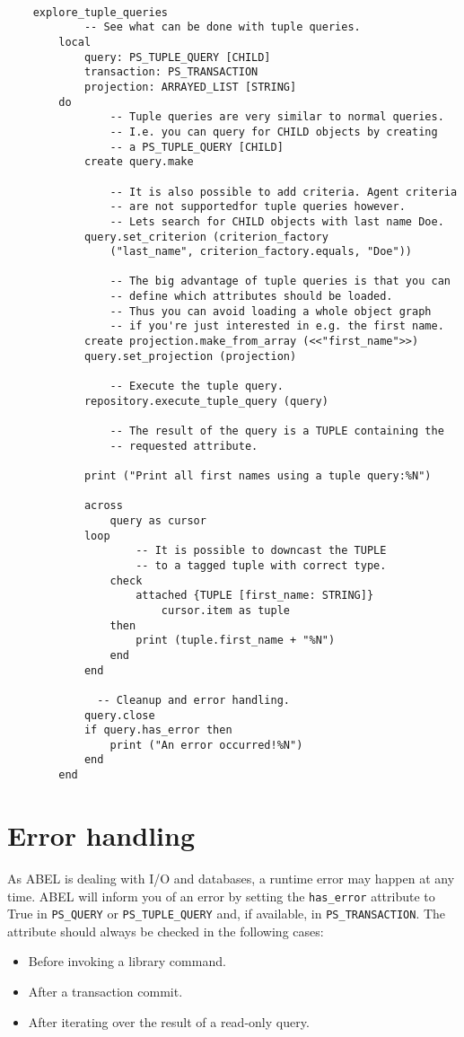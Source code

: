 \documentclass[a4paper,12pt]{report}
\begin{document}
\begin{lstlisting}[language=OOSC2Eiffel, captionpos=b, caption={Using tuple queries.}, label={lst:tuple_query_simple}]

	explore_tuple_queries
			-- See what can be done with tuple queries.
		local
			query: PS_TUPLE_QUERY [CHILD]
			transaction: PS_TRANSACTION
			projection: ARRAYED_LIST [STRING]
		do
				-- Tuple queries are very similar to normal queries.
				-- I.e. you can query for CHILD objects by creating
				-- a PS_TUPLE_QUERY [CHILD]
			create query.make

				-- It is also possible to add criteria. Agent criteria 
				-- are not supportedfor tuple queries however.
				-- Lets search for CHILD objects with last name Doe.
			query.set_criterion (criterion_factory
				("last_name", criterion_factory.equals, "Doe"))

				-- The big advantage of tuple queries is that you can 
				-- define which attributes should be loaded. 
				-- Thus you can avoid loading a whole object graph
				-- if you're just interested in e.g. the first name.
			create projection.make_from_array (<<"first_name">>)
			query.set_projection (projection)

				-- Execute the tuple query.
			repository.execute_tuple_query (query)

				-- The result of the query is a TUPLE containing the 
				-- requested attribute.

			print ("Print all first names using a tuple query:%N")
			
			across
				query as cursor
			loop
					-- It is possible to downcast the TUPLE 
					-- to a tagged tuple with correct type.
				check 
					attached {TUPLE [first_name: STRING]} 
						cursor.item as tuple 
				then
					print (tuple.first_name + "%N")
				end
			end
			
			  -- Cleanup and error handling.
			query.close
			if query.has_error then
				print ("An error occurred!%N")
			end			
		end
\end{lstlisting}

\chapter{Error handling}

As ABEL is dealing with I/O and databases, a runtime error may happen at any time.
ABEL will inform you of an error by setting the \lstinline!has_error! attribute to True in \lstinline!PS_QUERY! or \lstinline!PS_TUPLE_QUERY! and, if available, in \lstinline!PS_TRANSACTION!.
The attribute should always be checked in the following cases:
\begin{itemize}
 \item Before invoking a library command.
 \item After a transaction commit.
 \item After iterating over the result of a read-only query.
\end{itemize}
\end{document}
